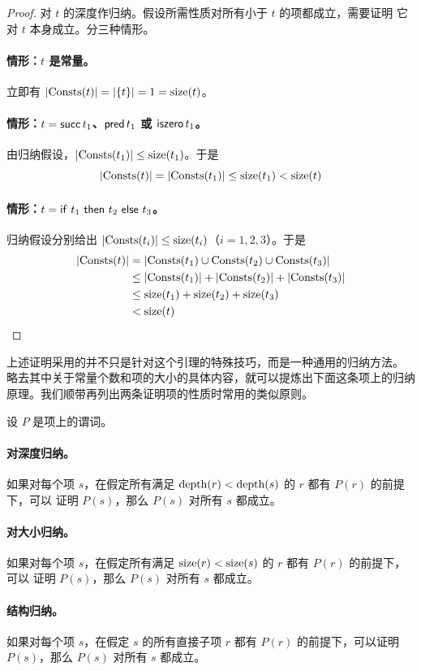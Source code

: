 \begin{proof}
对 \(t\) 的深度作归纳。假设所需性质对所有小于 \(t\) 的项都成立，需要证明
它对 \(t\) 本身成立。分三种情形。

\paragraph{情形：\(t\) 是常量。}
立即有
\(\lvert\operatorname{Consts}(t)\rvert=\lvert\{t\}\rvert=1=\operatorname{size}(t)\)。

\paragraph{情形：\(t=\mathsf{succ}\,t_1\)、\(\mathsf{pred}\,t_1\) 或
\(\mathsf{iszero}\,t_1\)。}
由归纳假设，\(\lvert\operatorname{Consts}(t_1)\rvert\leq\operatorname{size}(t_1)\)。于是
\[
 \lvert\operatorname{Consts}(t)\rvert
 =\lvert\operatorname{Consts}(t_1)\rvert
 \leq\operatorname{size}(t_1)
 <\operatorname{size}(t)
\]

\paragraph{情形：\(t=\mathsf{if}\ t_1\ \mathsf{then}\ t_2\ \mathsf{else}\ t_3\)。}
归纳假设分别给出
\(\lvert\operatorname{Consts}(t_i)\rvert\leq\operatorname{size}(t_i)\)（\(i=1,2,3\)）。于是
\[
\begin{aligned}
 \lvert\operatorname{Consts}(t)\rvert
 &=\lvert\operatorname{Consts}(t_1)\cup\operatorname{Consts}(t_2)\cup\operatorname{Consts}(t_3)\rvert\\
 &\leq\lvert\operatorname{Consts}(t_1)\rvert+\lvert\operatorname{Consts}(t_2)\rvert
      +\lvert\operatorname{Consts}(t_3)\rvert\\
 &\leq\operatorname{size}(t_1)+\operatorname{size}(t_2)+\operatorname{size}(t_3)\\
 &<\operatorname{size}(t)
\end{aligned}
\]
\end{proof}

上述证明采用的并不只是针对这个引理的特殊技巧，而是一种通用的归纳方法。
略去其中关于常量个数和项的大小的具体内容，就可以提炼出下面这条项上的归纳
原理。我们顺带再列出两条证明项的性质时常用的类似原则。

\begin{theorem}[项上的归纳原理]
\label{thm:3.3.4}
设 \(P\) 是项上的谓词。

\paragraph{对深度归纳。}
如果对每个项 \(s\)，在假定所有满足
\(\operatorname{depth}(r)<\operatorname{depth}(s)\) 的 \(r\) 都有 \(P(r)\) 的前提下，可以
证明 \(P(s)\)，那么 \(P(s)\) 对所有 \(s\) 都成立。

\paragraph{对大小归纳。}
如果对每个项 \(s\)，在假定所有满足
\(\operatorname{size}(r)<\operatorname{size}(s)\) 的 \(r\) 都有 \(P(r)\) 的前提下，可以
证明 \(P(s)\)，那么 \(P(s)\) 对所有 \(s\) 都成立。

\paragraph{结构归纳。}
如果对每个项 \(s\)，在假定 \(s\) 的所有直接子项 \(r\) 都有 \(P(r)\)
的前提下，可以证明 \(P(s)\)，那么 \(P(s)\) 对所有 \(s\) 都成立。
\end{theorem}

